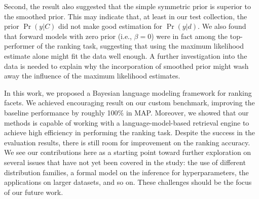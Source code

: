 Second, the result also suggested that the simple symmetric prior is superior
to the smoothed prior.  This may indicate that, at least in our test
collection, the prior $\Pr(y|C)$ did not make good estimation for $\Pr(y|d)$.
We also found that forward models with zero prior (i.e., $\beta = 0$) were in
fact among the top-performer of the ranking task, suggesting that using the
maximum likelihood estimate alone might fit the data well enough.  A further
investigation into the data is needed to explain why the incorporation of
smoothed prior might wash away the influence of the maximum likelihood
estimates.

In this work, we proposed a Bayesian language modeling framework for ranking
facets.  We achieved encouraging result on our custom benchmark, improving the
baseline performance by roughly 100\% in MAP.  Moreover, we showed that our
methods is capable of working with a language-model-based retrieval engine to
achieve high efficiency in performing the ranking task.  Despite the success in
the evaluation results, there is still room for improvement on the ranking
accuracy.  We see our contributions here as a starting point toward further
exploration on several issues that have not yet been covered in the study: the
use of different distribution families, a formal model on the inference for
hyperparameters, the applications on larger datasets, and so on.  These
challenges should be the focus of our future work.


